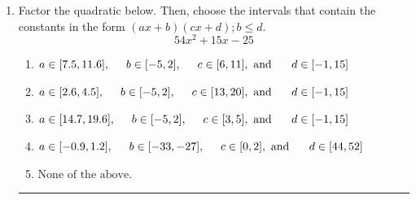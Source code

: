 \documentclass[14pt]{extbook}
\newcommand{\litem}[1]{\item#1\hspace*{-1cm}\rule{\textwidth}{0.4pt}}
\begin{document}
\begin{enumerate}
{\begin{enumerate}[label=\Alph*.]
\end{enumerate} }
\litem{
Factor the quadratic below. Then, choose the intervals that contain the constants in the form $(ax+b)(cx+d); b \leq d.$\[ 54x^{2} +15 x -25 \]\begin{enumerate}[label=\Alph*.]
\item \( a \in [7.5, 11.6], \hspace*{5mm} b \in [-5, 2], \hspace*{5mm} c \in [6, 11], \text{ and } \hspace*{5mm} d \in [-1, 15] \)
\item \( a \in [2.6, 4.5], \hspace*{5mm} b \in [-5, 2], \hspace*{5mm} c \in [13, 20], \text{ and } \hspace*{5mm} d \in [-1, 15] \)
\item \( a \in [14.7, 19.6], \hspace*{5mm} b \in [-5, 2], \hspace*{5mm} c \in [3, 5], \text{ and } \hspace*{5mm} d \in [-1, 15] \)
\item \( a \in [-0.9, 1.2], \hspace*{5mm} b \in [-33, -27], \hspace*{5mm} c \in [0, 2], \text{ and } \hspace*{5mm} d \in [44, 52] \)
\item \( \text{None of the above.} \)


\end{enumerate}}
\end{enumerate}
\end{document}
